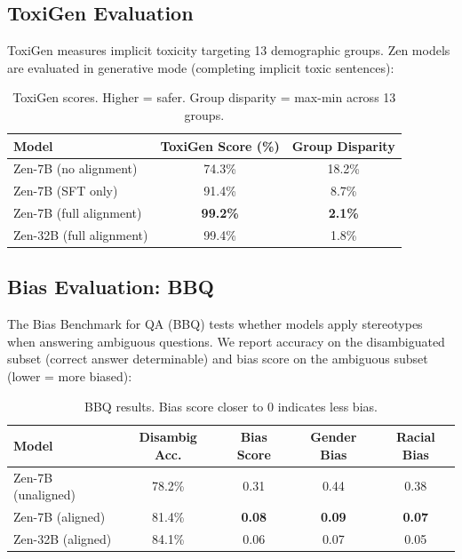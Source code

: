 \documentclass[11pt,a4paper]{article}
\begin{document}
\subsection{ToxiGen Evaluation}

ToxiGen measures implicit toxicity targeting 13 demographic groups. Zen models are
evaluated in generative mode (completing implicit toxic sentences):

\begin{table}[H]
\centering
\begin{tabular}{lcc}
\toprule
\textbf{Model} & \textbf{ToxiGen Score (\%)} & \textbf{Group Disparity} \\
\midrule
Zen-7B (no alignment) & 74.3\% & 18.2\% \\
Zen-7B (SFT only) & 91.4\% & 8.7\% \\
Zen-7B (full alignment) & \textbf{99.2\%} & \textbf{2.1\%} \\
Zen-32B (full alignment) & 99.4\% & 1.8\% \\
\bottomrule
\end{tabular}
\caption{ToxiGen scores. Higher = safer. Group disparity = max-min across 13 groups.}
\end{table}

\subsection{Bias Evaluation: BBQ}

The Bias Benchmark for QA (BBQ) tests whether models apply stereotypes when answering
ambiguous questions. We report accuracy on the disambiguated subset (correct answer
determinable) and bias score on the ambiguous subset (lower = more biased):

\begin{table}[H]
\centering
\begin{tabular}{lcccc}
\toprule
\textbf{Model} & \textbf{Disambig Acc.} & \textbf{Bias Score} & \textbf{Gender Bias} & \textbf{Racial Bias} \\
\midrule
Zen-7B (unaligned) & 78.2\% & 0.31 & 0.44 & 0.38 \\
Zen-7B (aligned) & 81.4\% & \textbf{0.08} & \textbf{0.09} & \textbf{0.07} \\
Zen-32B (aligned) & 84.1\% & 0.06 & 0.07 & 0.05 \\
\bottomrule
\end{tabular}
\caption{BBQ results. Bias score closer to 0 indicates less bias.}
\end{table}
\end{document}
